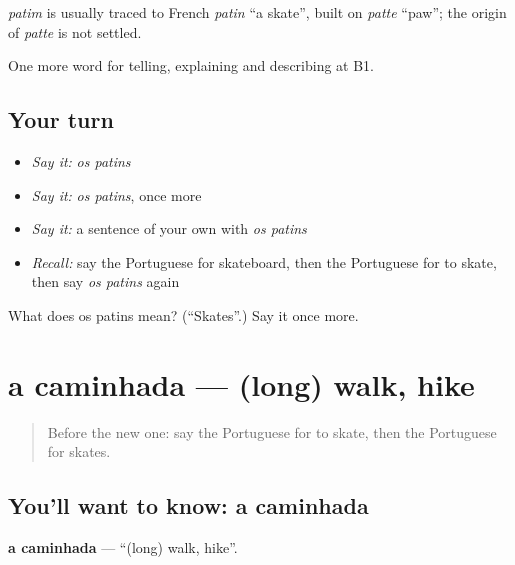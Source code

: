 \begin{cousinweb}
\emph{patim} is usually traced to French \emph{patin} \textquotedblleft{}a skate\textquotedblright{}, built on \emph{patte} \textquotedblleft{}paw\textquotedblright{}; the origin of \emph{patte} is not settled.
\end{cousinweb}

\begin{grammarlens}[title={What you've built}]
One more word for telling, explaining and describing at B1.
\end{grammarlens}

\subsection*{Your turn}
\begin{itemize}
\raggedright
  \item \emph{Say it:} \emph{os patins}
  \item \emph{Say it:} \emph{os patins}, once more
  \item \emph{Say it:} a sentence of your own with \emph{os patins}
  \item \emph{Recall:} say the Portuguese for skateboard, then the Portuguese for to skate, then say \emph{os patins} again
\end{itemize}

\begin{tcolorbox}[breakable,colback=teal!4,colframe=teal!35!black,title={Before you move on}]
What does os patins mean? (\textquotedblleft{}Skates\textquotedblright{}.) Say it once more.
\end{tcolorbox}
\section[a caminhada]{a caminhada — (long) walk, hike}

\label{lesson:PT-C507-caminhada}



\begin{quote}
Before the new one: say the Portuguese for to skate, then the Portuguese for skates.
\end{quote}

\subsection*{You'll want to know: a caminhada}
\textbf{a caminhada} — \textquotedblleft{}(long) walk, hike\textquotedblright{}.

